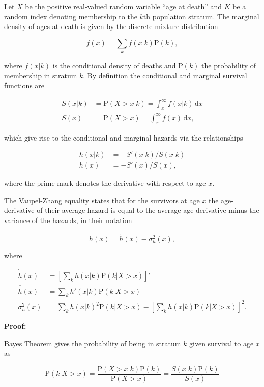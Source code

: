 \documentclass[10pt,twoside,reqno]{article}
\begin{document}
  Let \(X\) be the positive real-valued random variable ``age at death'' and \(K\) be a random index denoting membership to the \(k\)th population stratum. The marginal density of ages at death is given by the discrete mixture distribution

  \[
  f(x)=\sum_k f(x|k)\mathrm{P}(k),
  \]

  where \(f(x|k)\) is the conditional density of deaths and \(\mathrm{P}(k)\) the probability of membership in stratum \(k\). By definition the conditional and marginal survival functions are

  \[
  \begin{aligned}
  S(x|k) &= \mathrm{P}(X>x|k) = \int_x^\infty f(x|k)\,\text{d}x \\
  S(x) &= \mathrm{P}(X>x) = \int_x^\infty f(x)\,\text{d}x,
  \end{aligned}
  \]

  which give rise to the conditional and marginal hazards via the relationships

  \[
  \begin{aligned}
  h(x|k) &= -S'(x|k)/S(x|k)\\
  h(x) &= -S'(x)/S(x),
  \end{aligned}
  \]

  where the prime mark denotes the derivative with respect to age \(x\).

  The Vaupel-Zhang equality states that for the survivors at age \(x\) the age-derivative of their average hazard is equal to the average age derivative minus the variance of the hazards, in their notation

  \[
  \dot{\overline{h}}(x) = \overline{\dot{h}}(x) - \sigma_h^2(x),
  \]

  where

  \[
  \begin{aligned}
    \dot{\overline{h}}(x) &= \left[\sum_k h(x|k)\mathrm{P}(k|X>x)\right]' \\
    \overline{\dot{h}}(x) &= \sum_k h'(x|k)\mathrm{P}(k|X>x) \\
    \sigma_h^2(x) &=
      \sum_k h(x|k)^2 \mathrm{P}(k|X>x) -
      \left[\sum_k h(x|k)\mathrm{P}(k|X>x)\right]^2.
  \end{aligned}
  \]

  \textbf{Proof:}

  Bayes Theorem gives the probability of being in stratum \(k\) given survival to age \(x\) as

  \[
  \mathrm{P}(k|X>x) = \frac{\mathrm{P}(X>x|k)\mathrm{P}(k)} {\mathrm{P}(X>x)} =     \frac{S(x|k)\mathrm{P}(k)}{S(x)}
  \]
\end{document}
